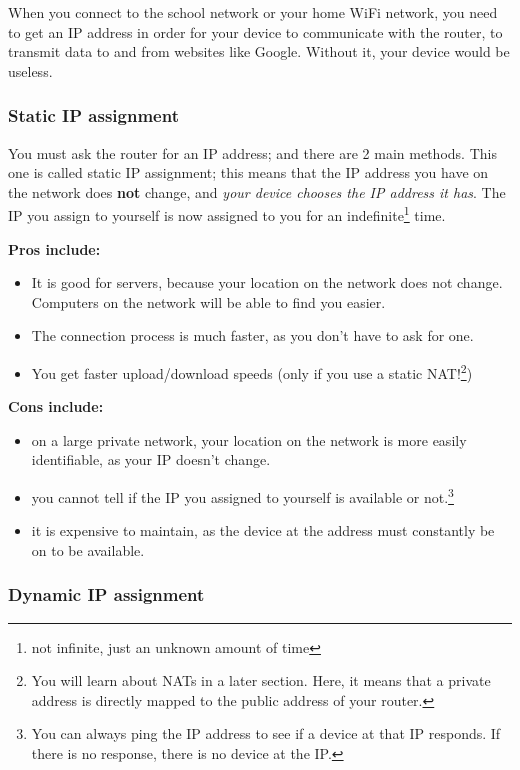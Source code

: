 \documentclass[../main.tex]{subfiles}
\begin{document}
When you connect to the school network or your home WiFi network, you need to get an IP address in order for your device to communicate with the router, to transmit data to and from websites like Google. Without it, your device would be useless. 

\subsubsection{Static IP assignment}

You must ask the router for an IP address; and there are 2 main methods. This one is called static IP assignment; this means that the IP address you have on the network does \textbf{not} change, and \emph{your device chooses the IP address it has}. The IP you assign to yourself is now assigned to you for an indefinite\footnote{not infinite, just an unknown amount of time} time.

\textbf{Pros include:}
\begin{itemize}
    \item It is good for servers, because your location on the network does not change. Computers on the network will be able to find you easier.
    \item The connection process is much faster, as you don't have to ask for one.
    \item You get faster upload/download speeds (only if you use a static NAT!\footnote{You will learn about NATs in a later section. Here, it means that a private address is directly mapped to the public address of your router.})
\end{itemize}

\textbf{Cons include:}
\begin{itemize}
    \item on a large private network, your location on the network is more easily identifiable, as your IP doesn't change.
    \item you cannot tell if the IP you assigned to yourself is available or not.\footnote{You can always ping the IP address to see if a device at that IP responds. If there is no response, there is no device at the IP.}
    \item it is expensive to maintain, as the device at the address must constantly be on to be available.
\end{itemize}

\subsubsection{Dynamic IP assignment}
\end{document}
